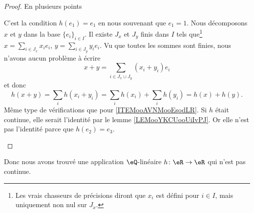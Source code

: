 \begin{proof}
	En plusieurs points
	\begin{subproof}
		 C'est la condition \( h(e_1)=e_1\) en nous souvenant que \( e_1=1\).
		 Nous décomposons \( x\) et \( y\) dans la base  \( \{ e_i \}_{i\in I}\). Il existe \( J_x\) et \( J_y \) finis dans \( I\) tels que\footnote{Les vrais chasseurs de précisions diront que \( x_i\) est défini pour \( i\in I\), mais uniquement non nul sur \( J_x\).} \( x=\sum_{i\in J_x}x_ie_i\), \( y=\sum_{i\in J_y}y_ie_i\). Vu que toutes les sommes sont finies, nous n'avons aucun problème à écrire
		\begin{equation}
			x+y=\sum_{i\in J_x\cup J_y}(x_i+y_i)e_i
		\end{equation}
		et donc
		\begin{equation}
			h(x+y)=\sum_ih(x_i+y_i)=\sum_i h(x_i)+\sum_i h(y_i)=h(x)+h(y).
		\end{equation}
		Même type de vérifications que pour \ref{ITEMooAVNMooEsodLR}.
		Si \( h\) était continue, elle serait l'identité par le lemme \ref{LEMooYKCUooUiIvPJ}. Or elle n'est pas l'identité parce que \( h(e_2)=e_3\).
	\end{subproof}
\end{proof}

Donc nous avons trouvé une application \( \eQ\)-linéaire \( h\colon \eR\to \eR\) qui n'est pas continue.
